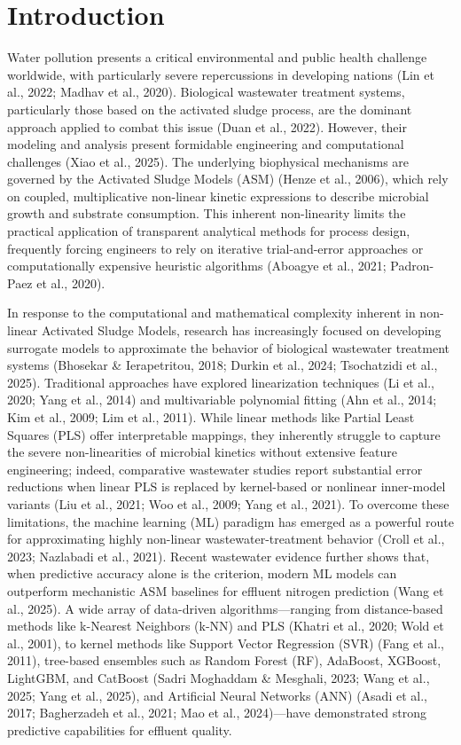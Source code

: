 \documentclass[a4paper,fleqn]{cas-sc}
\begin{document}
\section{Introduction}

Water pollution presents a critical environmental and public health challenge worldwide, with particularly severe repercussions in developing nations (Lin et al., 2022; Madhav et al., 2020). Biological wastewater treatment systems, particularly those based on the activated sludge process, are the dominant approach applied to combat this issue (Duan et al., 2022). However, their modeling and analysis present formidable engineering and computational challenges (Xiao et al., 2025). The underlying biophysical mechanisms are governed by the Activated Sludge Models (ASM) (Henze et al., 2006), which rely on coupled, multiplicative non-linear kinetic expressions to describe microbial growth and substrate consumption. This inherent non-linearity limits the practical application of transparent analytical methods for process design, frequently forcing engineers to rely on iterative trial-and-error approaches or computationally expensive heuristic algorithms (Aboagye et al., 2021; Padron-Paez et al., 2020).

In response to the computational and mathematical complexity inherent in non-linear Activated Sludge Models, research has increasingly focused on developing surrogate models to approximate the behavior of biological wastewater treatment systems (Bhosekar \& Ierapetritou, 2018; Durkin et al., 2024; Tsochatzidi et al., 2025). Traditional approaches have explored linearization techniques (Li et al., 2020; Yang et al., 2014) and multivariable polynomial fitting (Ahn et al., 2014; Kim et al., 2009; Lim et al., 2011). While linear methods like Partial Least Squares (PLS) offer interpretable mappings, they inherently struggle to capture the severe non-linearities of microbial kinetics without extensive feature engineering; indeed, comparative wastewater studies report substantial error reductions when linear PLS is replaced by kernel-based or nonlinear inner-model variants (Liu et al., 2021; Woo et al., 2009; Yang et al., 2021). To overcome these limitations, the machine learning (ML) paradigm has emerged as a powerful route for approximating highly non-linear wastewater-treatment behavior (Croll et al., 2023; Nazlabadi et al., 2021). Recent wastewater evidence further shows that, when predictive accuracy alone is the criterion, modern ML models can outperform mechanistic ASM baselines for effluent nitrogen prediction (Wang et al., 2025). A wide array of data-driven algorithms---ranging from distance-based methods like k-Nearest Neighbors (k-NN) and PLS (Khatri et al., 2020; Wold et al., 2001), to kernel methods like Support Vector Regression (SVR) (Fang et al., 2011), tree-based ensembles such as Random Forest (RF), AdaBoost, XGBoost, LightGBM, and CatBoost (Sadri Moghaddam \& Mesghali, 2023; Wang et al., 2025; Yang et al., 2025), and Artificial Neural Networks (ANN) (Asadi et al., 2017; Bagherzadeh et al., 2021; Mao et al., 2024)---have demonstrated strong predictive capabilities for effluent quality. 
\end{document}
